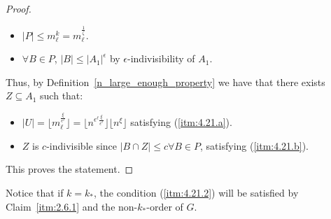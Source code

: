 \begin{proof}
\begin{itemize}
                \item $|P| \leq m_\ell^k = m_\ell^{\frac{1}{\zeta}}$.
                \item $\forall B \in P$, $|B| \leq |A_1|^\epsilon$ by $\epsilon$-indivisibility of $A_1$.
            \end{itemize}
            Thus, by Definition~\ref{n_large_enough_property} we have that there exists $Z \subseteq A_1$ such that:
            \begin{itemize}
                \item $|U| = \lfloor m_\ell^{\frac{\xi}{\epsilon^\ell}} \rfloor = \lfloor n^{\epsilon^\ell \frac{\xi}{\epsilon^\ell}} \rfloor
                    \lfloor n^\xi \rfloor$ satisfying (\ref{itm:4.21.a}).
                \item $Z$ is $c$-indivisible since $|B \cap Z| \leq c \forall B \in P$, satisfying (\ref{itm:4.21.b}).
            \end{itemize}
            This proves the statement.
        \end{proof}

    \lemma[Remark 4.22]\label{k_asterisk_enough_for_k}
    Notice that if $k = k_*$, the condition (\ref{itm:4.21.2}) will be satisfied by Claim~\ref{itm:2.6.1}
    and the non-$k_*$-order of $G$.

